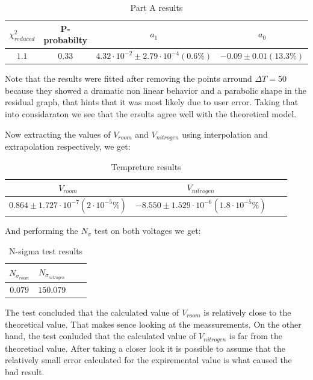 \documentclass[12pt,a4paper]{report}
\begin{document}
  \begin{table}[htbp]
      \centering
      \label{tab:partA_summary}
      \begin{tabular}{@{}cccc@{}}
        \toprule
        $\chi ^2_{reduced}$ & P-probabilty & $a_1$ & $a_0$ \\
        \midrule
        $1.1$ & $0.33$ & $4.32 \cdot 10^{-2} \pm 2.79 \cdot 10^{-4} (0.6\%)$ & $-0.09 \pm 0.01 (13.3\%)$ \\
        \bottomrule
      \end{tabular}
      \caption{Part A results}
    \end{table}
Note that the results were fitted after removing the points arround  $\Delta T = 50$ because they showed a dramatic non linear behavior and a parabolic shape in the residual graph, that hints that it was most likely due to user error.
Taking that into considaraton we see that the ersults agree well with the theoretical model.

Now extracting the values of $V_{room}$ and $V_{nitrogen}$ using interpolation and extrapolation respectively, we get: 
\begin{table}[htbp]
    \centering
    \label{Part A tempreture results}
    \begin{tabular}{@{}cccc@{}}
      \toprule
       $V_{room}$ & $V_{nitrogen}$ \\
      \midrule
      $0.864 \pm 1.727 \cdot 10^{-7} (2 \cdot 10^{-5} \%)$ & $-8.550 \pm 1.529 \cdot 10^{-6} (1.8 \cdot 10^{-5} \%)$ \\
      \bottomrule
    \end{tabular}
    \caption{Tempreture results}
\end{table}
\pagebreak

And performing the $N_\sigma$ test on both voltages we get:

\begin{table}[htbp]
    \centering
    \label{Part A N-sigma test results}
    \begin{tabular}{@{}cccc@{}}
      \toprule
       $N_{\sigma_{room}} $& $N_{\sigma_{nitrogen}}$ \\
      \midrule
      $0.079$ & $150.079$ \\
      \bottomrule
    \end{tabular}
    \caption{N-sigma test results}

\end{table}
The test concluded that the calculated value of $V_{room}$ is relatively close to the theoretical value. That makes sence looking at the meassurements. 
On the other hand, the test conluded that the calculated value of $V_{nitrogen}$ is far from the theoretiacl value. After taking a closer look it is possible to assume that the relatively small error calculated for the expiremental value is what caused the bad result. 
\end{document}
